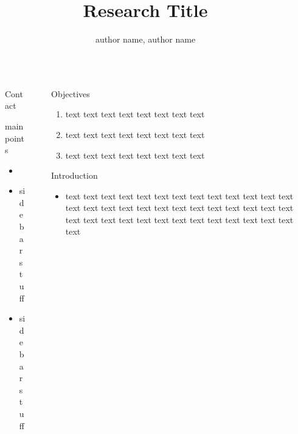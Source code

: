 \documentclass[final,hyperref={pdfpagelabels=false}]{beamer}
\title{\huge Research Title}
\author{author name, author name}
\institute{University}
\begin{document}
\begin{frame}[t] 

\begin{columns}[t] 

\begin{column}{0.02\textwidth}\end{column} %



\begin{column}{0.11\textwidth} %
	\begin{block}{Contact}
		
	\end{block}




	\begin{block}{main points}
		\begin{itemize}
			\item 
			\item sidebar stuff
			\item sidebar stuff
		\end{itemize}
	\end{block}

\end{column}



\begin{column}{0.02\textwidth}\end{column} %


\begin{column}{0.405\textwidth} %

	\begin{block}{Objectives}
		\begin{enumerate}
			\item text text text text text text text text
			\item text text text text text text text text
			\item text text text text text text text text
		\end{enumerate}
	\end{block}


	\begin{block}{Introduction}

		\begin{itemize}
			\item text text text text text text text text text text text text text text text text text text text text text text text text text text text text text text text text text text text text text text text text
		\end{itemize}
	\end{block}




\end{column}
\end{columns}
\end{frame}
\end{document}
